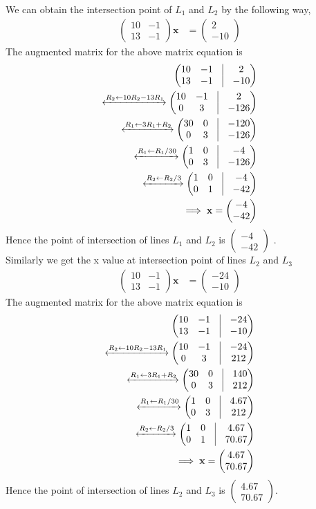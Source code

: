 \documentclass[16pt, a4paper, two column]{article}
\newcommand{\myvec}[1]{\ensuremath{\begin{pmatrix}#1\end{pmatrix}}}
\let\vec\mathbf
\begin{document}
We can obtain the intersection point of $L_1$ and $L_2$ by the following way,
\begin{align}
	\myvec{10 & -1 \\
		13 & -1}\vec{x} &= \myvec{2 \\ -10} 
\end{align}
The augmented matrix for the above matrix equation is 
\begin{align}
	\myvec{ 10 & -1 & \vrule & 2 \\
		13 & -1 & \vrule & -10} \\
	\xleftrightarrow[]{R_2 \leftarrow 10R_2-13R_1}
		\myvec{ 10 & -1 & \vrule & 2 \\
			0 & 3 & \vrule & -126} \\
	\xleftrightarrow[]{R_1 \leftarrow 3R_1+R_2}
		\myvec{ 30 & 0 & \vrule & -120 \\
			0 & 3 &\vrule & -126} \\
	\xleftrightarrow[]{R_1 \leftarrow R_1/30}
		\myvec{ 1 & 0 & \vrule & -4 \\
			0 & 3 & \vrule & -126} \\
	\xleftrightarrow[]{ R_2 \leftarrow R_2/3}
		\myvec{ 1 & 0 & \vrule & -4 \\
			0 & 1 & \vrule & -42} \\
	\implies \vec{x} = \myvec{-4 \\ -42}
\end{align}
Hence the point of intersection of lines $L_1$ and $L_2$ is $\myvec{-4 \\ -42}$ .\\
Similarly we get the x value at intersection point of lines $L_2$ and $L_3$
\begin{align}
	\myvec{10 & -1 \\
		13 & -1}\vec{x} &= \myvec{-24 \\ -10}
\end{align}
The augmented matrix for the above matrix equation is 
\begin{align}
	\myvec{ 10 & -1 & \vrule & -24 \\
		13 & -1 & \vrule & -10} \\
	\xleftrightarrow[]{R_2 \leftarrow 10R_2-13R_1}
		\myvec{ 10 & -1 & \vrule & -24 \\
			0 & 3 & \vrule & 212} \\
	\xleftrightarrow[]{R_1 \leftarrow 3R_1+R_2}
		\myvec{ 30 & 0 & \vrule & 140 \\
			0 & 3 &\vrule & 212} \\
	\xleftrightarrow[]{R_1 \leftarrow R_1/30}
		\myvec{ 1 & 0 & \vrule &  4.67\\
			0 & 3 & \vrule & 212} \\
	\xleftrightarrow[]{R_2 \leftarrow R_2/3}
		\myvec{ 1 & 0 & \vrule &  4.67\\
			0 & 1 & \vrule & 70.67} \\
	\implies \vec{x} = \myvec{4.67 \\ 70.67}
\end{align}
Hence the point of intersection of lines $L_2$ and $L_3$ is $\myvec{4.67 \\ 70.67}$.\\
\vspace{16pt}
\end{document}
